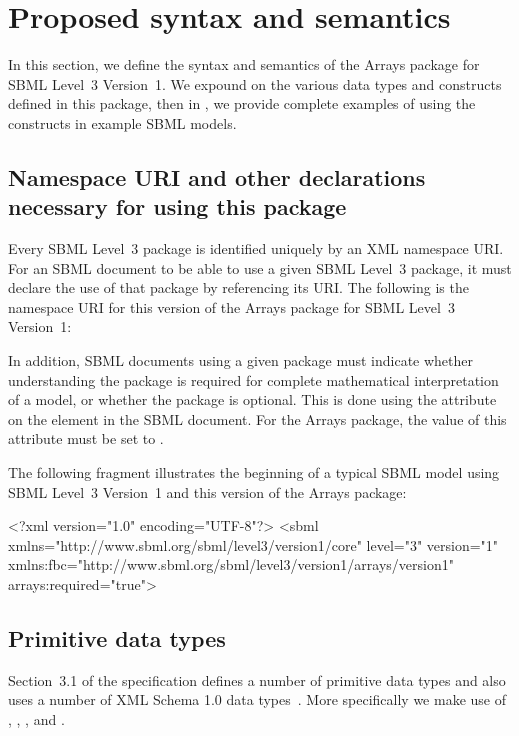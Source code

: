 
\section{Proposed syntax and semantics}
\label{syntax}

In this section, we define the syntax and semantics of the Arrays package for SBML Level~3 Version~1.  We expound on the various data types and constructs defined in this package, then in , we provide complete examples of using the constructs in example SBML models.

\subsection{Namespace URI and other declarations necessary for using this package}
\label{xml-namespace}

Every SBML Level~3 package is identified uniquely by an XML namespace URI.
For an SBML document to be able to use a given SBML Level~3 package, it
must declare the use of that package by referencing its URI.  The following
is the namespace URI for this version of the Arrays
package for SBML Level~3 Version~1:
\begin{center}
\end{center}

In addition, SBML documents using a given package must indicate whether
understanding the package is required for complete mathematical
interpretation of a model, or whether the package is optional.  This is
done using the attribute  on the  element in
the SBML document.  For the Arrays package, the value of
this attribute must be set to .

The following fragment illustrates the beginning of a typical SBML model
using SBML Level~3 Version~1 and this version of the Arrays package:

\begin{example}
<?xml version="1.0" encoding="UTF-8"?>
<sbml xmlns="http://www.sbml.org/sbml/level3/version1/core" level="3" version="1"
      xmlns:fbc="http://www.sbml.org/sbml/level3/version1/arrays/version1" arrays:required="true">
\end{example}

\subsection{Primitive data types}
Section~3.1 of the \sbmlthreecore specification defines a number of
primitive data types and also uses a number of XML Schema 1.0 data
types~\citep{biron:2000}.  More specifically we make use of , , , and .

